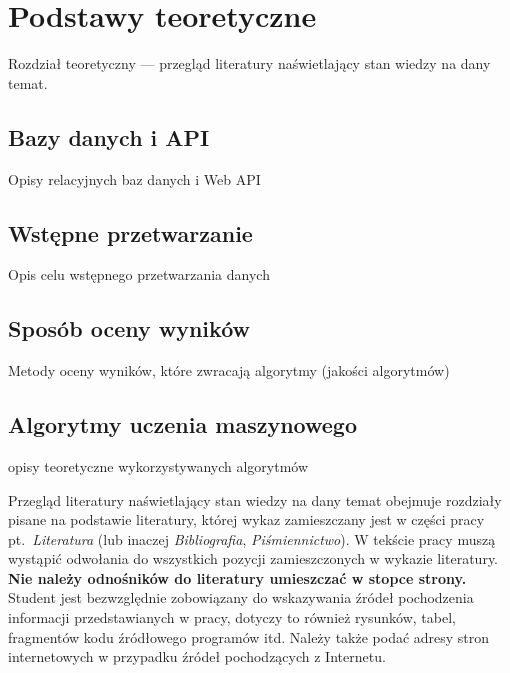 
\chapter{Podstawy teoretyczne}
Rozdział teoretyczny --- przegląd literatury naświetlający stan wiedzy na dany temat. 
\section{Bazy danych i API}
Opisy relacyjnych baz danych i Web API
\section{Wstępne przetwarzanie}
Opis celu wstępnego przetwarzania danych
\section{Sposób oceny wyników}
Metody oceny wyników, które zwracają algorytmy (jakości algorytmów)
\section{Algorytmy uczenia maszynowego}
opisy teoretyczne wykorzystywanych algorytmów


Przegląd literatury naświetlający stan wiedzy na dany temat obejmuje rozdziały pisane na podstawie
literatury, której wykaz zamieszczany jest w części pracy pt.~\emph{Literatura} (lub inaczej \emph{Bibliografia},
\emph{Piśmiennictwo}). W tekście pracy muszą wystąpić odwołania do wszystkich pozycji zamieszczonych w
wykazie literatury. \textbf{Nie należy odnośników do literatury umieszczać w stopce strony.} Student jest
bezwzględnie zobowiązany do wskazywania źródeł pochodzenia informacji przedstawianych w pracy,
dotyczy to również rysunków, tabel, fragmentów kodu źródłowego programów itd. Należy także podać
adresy stron internetowych w przypadku źródeł pochodzących z Internetu.


